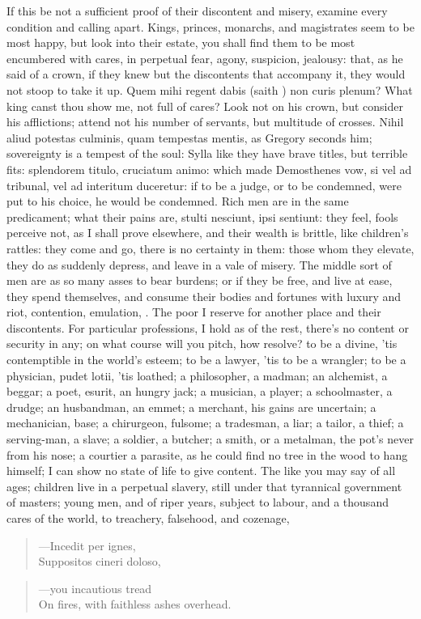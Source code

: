 {{If this be not a sufficient proof of their discontent and misery,
examine every condition and calling apart. Kings, princes, monarchs,
and magistrates seem to be most happy, but look into their estate, you
shall find them to be most encumbered with cares, in perpetual
fear, agony, suspicion, jealousy: that, as he said of a crown, if
they knew but the discontents that accompany it, they would not stoop
to take it up. Quem mihi regent dabis (saith \Chrysostom{}) non curis
plenum? What king canst thou show me, not full of cares? Look not
on his crown, but consider his afflictions; attend not his number of
servants, but multitude of crosses. Nihil aliud potestas culminis, quam
tempestas mentis, as Gregory seconds him; sovereignty is a tempest of
the soul: Sylla like they have brave titles, but terrible fits:
splendorem titulo, cruciatum animo: which made Demosthenes vow,
si vel ad tribunal, vel ad interitum duceretur: if to be a judge, or to
be condemned, were put to his choice, he would be condemned. Rich men
are in the same predicament; what their pains are, stulti nesciunt,
ipsi sentiunt: they feel, fools perceive not, as I shall prove
elsewhere, and their wealth is brittle, like children's rattles: they
come and go, there is no certainty in them: those whom they elevate,
they do as suddenly depress, and leave in a vale of misery. The middle
sort of men are as so many asses to bear burdens; or if they be free,
and live at ease, they spend themselves, and consume their bodies and
fortunes with luxury and riot, contention, emulation, \etc{}. The poor I
reserve for another place and their discontents.
For particular professions, I hold as of the rest, there's no content
or security in any; on what course will you pitch, how resolve? to be a
divine, 'tis contemptible in the world's esteem; to be a lawyer, 'tis
to be a wrangler; to be a physician, pudet lotii, 'tis loathed; a
philosopher, a madman; an alchemist, a beggar; a poet, esurit, an
hungry jack; a musician, a player; a schoolmaster, a drudge; an
husbandman, an emmet; a merchant, his gains are uncertain; a
mechanician, base; a chirurgeon, fulsome; a tradesman, a liar; a
tailor, a thief; a serving-man, a slave; a soldier, a butcher; a smith,
or a metalman, the pot's never from his nose; a courtier a parasite, as
he could find no tree in the wood to hang himself; I can show no state
of life to give content. The like you may say of all ages; children
live in a perpetual slavery, still under that tyrannical government of
masters; young men, and of riper years, subject to labour, and a
thousand cares of the world, to treachery, falsehood, and cozenage,
%
\begin{verse}
---\textlatin{Incedit per ignes},\\
\textlatin{Suppositos cineri doloso},
\end{verse}
\translationrule
\begin{verse}
---you incautious tread\\
On fires, with faithless ashes overhead.
\end{verse}

}}
